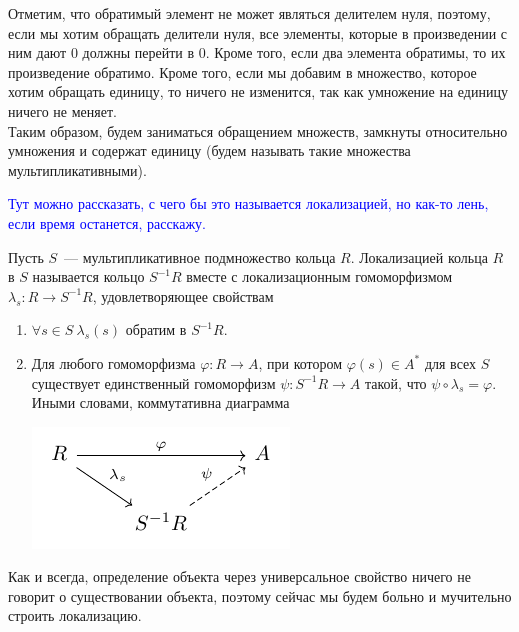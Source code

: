 \documentclass[11pt]{report}
\begin{document}
    \begin{remark}
        Отметим, что обратимый элемент не может являться делителем нуля, поэтому, если мы хотим обращать делители нуля,
        все элементы, которые в произведении с ним дают 0 должны перейти в 0. Кроме того, если два элемента обратимы, то их
        произведение обратимо. Кроме того, если мы добавим в множество, которое хотим обращать единицу, то ничего не изменится, так как
        умножение на единицу ничего не меняет. \\

        Таким образом, будем заниматься обращением множеств, замкнуты относительно умножения и содержат единицу (будем называть такие
        множества мультипликативными).
    \end{remark}
    \textcolor{blue}{Тут можно рассказать, с чего бы это называется локализацией, но как-то лень, если время останется, расскажу.}
    \begin{definition}
        Пусть $S$~--- мультипликативное подмножество кольца $R$. Локализацией кольца $R$ в $S$ называется кольцо $S^{-1}R$ вместе с
        локализационным гомоморфизмом $\lambda_s\colon R \to S^{-1}R$, удовлетворяющее свойствам
        \begin{enumerate}
            \item $\forall s \in S \ \lambda_s(s)$ обратим в $S^{-1}R$.
            \item Для любого гомоморфизма $\varphi\colon R \to A$, при котором $\varphi(s) \in A^{*}$ для всех $S$ существует
                  единственный гомоморфизм $\psi\colon S^{-1}R \to A$ такой, что $\psi \circ \lambda_s = \varphi$.
                  Иными словами, коммутативна диаграмма
                  \begin{center}
                      \includegraphics[scale = 1]{cd.pdf}
                  \end{center}

        \end{enumerate}
    \end{definition}

    Как и всегда, определение объекта через универсальное свойство ничего не говорит о существовании объекта, поэтому
    сейчас мы будем больно и мучительно строить локализацию.\\
\end{document}
